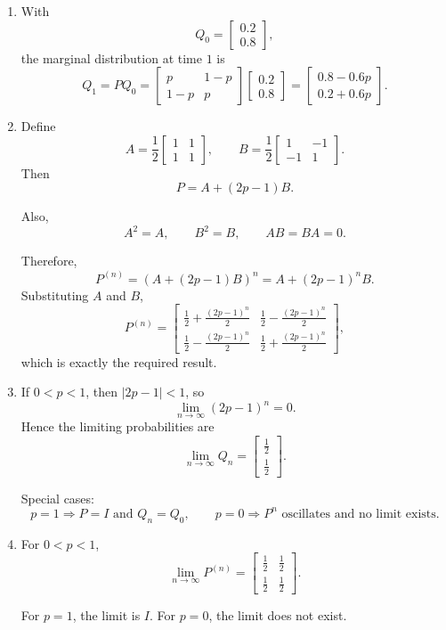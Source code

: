 \documentclass[11pt]{article}
\begin{document}
\begin{enumerate}[label=\alph*)]
\item With
\[
Q_0=
\begin{bmatrix}
0.2\\
0.8
\end{bmatrix},
\]
the marginal distribution at time \(1\) is
\[
Q_1=PQ_0=
\begin{bmatrix}
p & 1-p\\
1-p & p
\end{bmatrix}
\begin{bmatrix}
0.2\\
0.8
\end{bmatrix}
=
\begin{bmatrix}
0.8-0.6p\\
0.2+0.6p
\end{bmatrix}.
\]

\item Define
\[
A=\frac{1}{2}
\begin{bmatrix}
1 & 1\\
1 & 1
\end{bmatrix},
\qquad
B=\frac{1}{2}
\begin{bmatrix}
1 & -1\\
-1 & 1
\end{bmatrix}.
\]
Then
\[
P=A+(2p-1)B.
\]

Also,
\[
A^2=A,\qquad B^2=B,\qquad AB=BA=0.
\]

Therefore,
\[
P^{(n)} = \left(A+(2p-1)B\right)^n = A+(2p-1)^nB.
\]
Substituting \(A\) and \(B\),
\[
P^{(n)}=
\begin{bmatrix}
\frac{1}{2}+\frac{(2p-1)^n}{2} & \frac{1}{2}-\frac{(2p-1)^n}{2}\\[4pt]
\frac{1}{2}-\frac{(2p-1)^n}{2} & \frac{1}{2}+\frac{(2p-1)^n}{2}
\end{bmatrix},
\]
which is exactly the required result.

\item If \(0<p<1\), then \(|2p-1|<1\), so
\[
\lim_{n\to\infty}(2p-1)^n=0.
\]
Hence the limiting probabilities are
\[
\boxed{
\lim_{n\to\infty}Q_n=
\begin{bmatrix}
\tfrac{1}{2}\\
\tfrac{1}{2}
\end{bmatrix}.}
\]

Special cases:
\[
p=1 \Rightarrow P=I \text{ and } Q_n=Q_0,
\qquad
p=0 \Rightarrow P^n \text{ oscillates and no limit exists.}
\]

\item For \(0<p<1\),
\[
\boxed{
\lim_{n\to\infty}P^{(n)}=
\begin{bmatrix}
\tfrac{1}{2} & \tfrac{1}{2}\\
\tfrac{1}{2} & \tfrac{1}{2}
\end{bmatrix}.}
\]

For \(p=1\), the limit is \(I\). For \(p=0\), the limit does not exist.
\end{enumerate}
\end{document}

